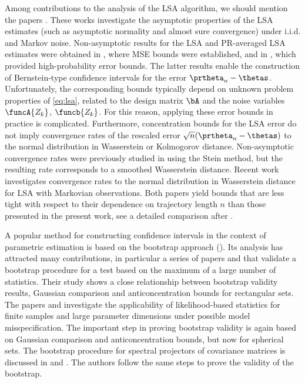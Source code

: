 Among contributions to the analysis of the LSA algorithm, we should mention the papers \cite{polyak1992acceleration, kushner2003stochastic, borkar:sa:2008, benveniste2012adaptive}. These works investigate the asymptotic properties of the LSA estimates (such as asymptotic normality and almost sure convergence) under i.i.d. and Markov noise. Non-asymptotic results for the LSA and PR-averaged LSA estimates were obtained in \cite{rakhlin2012making, nemirovski2009robust, bhandari2018finite, lakshminarayanan2018linear, mou2021optimal}, where MSE bounds were established, and in \cite{mou2020linear, durmus2021tight, durmus2022finite}, which provided high-probability error bounds. The latter results enable the construction of Bernstein-type confidence intervals for the error $\prtheta_{n}-\thetas$. Unfortunately, the corresponding bounds typically depend on unknown problem properties of \eqref{eq:lsa}, related to the design matrix $\bA$ and the noise variables $\funcA{Z_k}$, $\funcb{Z_k}$. For this reason, applying these error bounds in practice is complicated. Furthermore, concentration bounds for the LSA error \cite{mou2020linear, durmus2021tight, durmus2022finite} do not imply convergence rates of the rescaled error $\sqrt{n}(\prtheta_{n} - \thetas)$ to the normal distribution in Wasserstein or Kolmogorov distance. Non-asymptotic convergence rates were previously studied in \cite{pmlr-v99-anastasiou19a} using the Stein method, but the resulting rate corresponds to a smoothed Wasserstein distance. Recent work \cite{srikant2024rates} investigates convergence rates to the normal distribution in Wasserstein distance for LSA with Markovian observations. Both papers yield bounds that are less tight with respect to their dependence on trajectory length $n$ than those presented in the present work, see a detailed comparison after . 
\par 
A popular method for constructing confidence intervals in the context of parametric estimation is based on the bootstrap approach (\cite{efron1992bootstrap}). Its analysis has attracted many contributions, in particular a series of papers \cite{Chernozhukov2013} and \cite{Chernozhukov2015} that validate a bootstrap procedure for a test based on the maximum of a large number of statistics. Their study shows a close relationship between bootstrap validity results, Gaussian comparison and anticoncentration bounds for rectangular sets. The papers \cite{spokoiny2015} and \cite{Bernolli2019} investigate the applicability of likelihood-based statistics for finite samples and large parameter dimensions under possible model misspecification. The important step in proving bootstrap validity is again based on Gaussian comparison and anticoncentration bounds, but now for spherical sets. The bootstrap procedure for spectral projectors of covariance matrices is discussed in \cite{PTRF2019} and \cite{jirak2022quantitative}. The authors follow the same steps to prove the validity of the bootstrap. 
